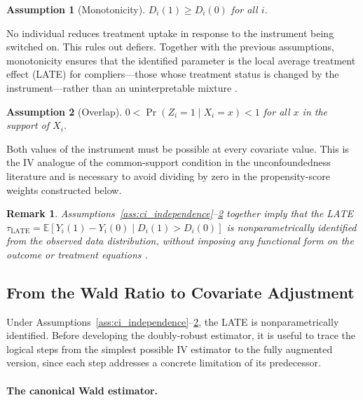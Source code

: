 \documentclass[12pt,a4paper]{article}
\newtheorem{assumption}{Assumption}
\newtheorem{remark}{Remark}
\newcommand{\E}{\mathbb{E}}
\begin{document}
\begin{assumption}[Monotonicity]
\label{ass:monotonicity}
$D_i(1) \geq D_i(0)$ for all $i$.
\end{assumption}

No individual reduces treatment uptake in response to the instrument being switched on.
This rules out defiers. Together with the previous assumptions, monotonicity ensures that
the identified parameter is the local average treatment effect (LATE) for compliers---those
whose treatment status is changed by the instrument---rather than an uninterpretable mixture
\citep[Theorem~1]{angrist1995identification}.

\begin{assumption}[Overlap]
\label{ass:overlap}
$0 < \Pr(Z_i = 1 \mid X_i = x) < 1$ for all $x$ in the support of $X_i$.
\end{assumption}

Both values of the instrument must be possible at every covariate value. This is the IV
analogue of the common-support condition in the unconfoundedness literature and is
necessary to avoid dividing by zero in the propensity-score weights constructed below.

\begin{remark}
Assumptions~\ref{ass:ci_independence}--\ref{ass:overlap} together imply that the LATE
$\tau_{\mathrm{LATE}} = \E[Y_i(1) - Y_i(0) \mid D_i(1) > D_i(0)]$ is nonparametrically
identified from the observed data distribution, without imposing any functional form on
the outcome or treatment equations
\citep[Section~2]{tan2006regression}.
\end{remark}

\subsection{From the Wald Ratio to Covariate Adjustment}
\label{subsec:wald_motivation}

Under Assumptions~\ref{ass:ci_independence}--\ref{ass:overlap}, the LATE is
nonparametrically identified. Before developing the doubly-robust estimator, it is useful to
trace the logical steps from the simplest possible IV estimator to the fully augmented version,
since each step addresses a concrete limitation of its predecessor.

\paragraph{The canonical Wald estimator.}
\end{document}
